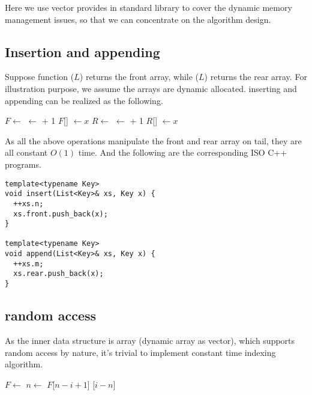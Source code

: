 \documentclass[UTF8]{article}
\begin{document}
Here we use vector provides in standard library to cover the dynamic memory management issues, so
that we can concentrate on the algorithm design.

\subsection{Insertion and appending}
Suppose function ($L$) returns the front array, while ($L$) returns the
rear array. For illustration purpose, we assume the arrays are dynamic allocated. inserting and appending
can be realized as the following.

\begin{algorithmic}
  \State $F \gets $ 
  \State {} $\gets $  + 1
  \State $F$[] $\gets x$
\EndFunction
\Statex
{}
  \State $R \gets $ 
  \State {} $\gets $  + 1
  \State $R$[] $\gets x$
\EndFunction
\end{algorithmic}

As all the above operations manipulate the front and rear array on tail, they are all constant $O(1)$ time. And the following are the corresponding ISO C++ programs.

\begin{lstlisting}
template<typename Key>
void insert(List<Key>& xs, Key x) {
  ++xs.n;
  xs.front.push_back(x);
}

template<typename Key>
void append(List<Key>& xs, Key x) {
  ++xs.m;
  xs.rear.push_back(x);
}
\end{lstlisting}

\subsection{random access}
As the inner data structure is array (dynamic array as vector), which supports random access
by nature, it's trivial to implement constant time indexing algorithm.

\begin{algorithmic}
  \State $F \gets $ 
  \State $n \gets $ 
    \State \Return $F$[$n-i+1$]
  \Else
    \State {}[$i-n$]
  \EndIf
\EndFunction
\end{algorithmic}
\end{document}
